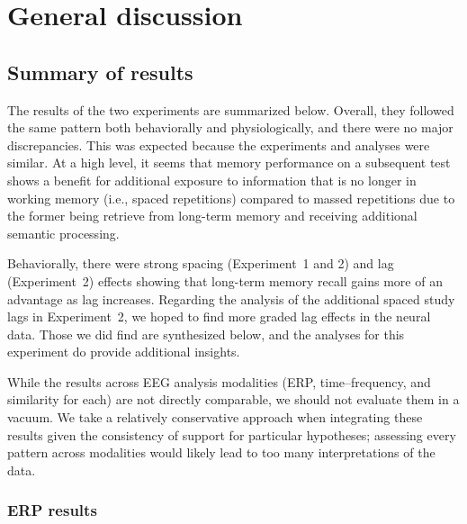 
\chapter{General discussion}


\section{Summary of results}


The results of the two experiments are summarized below.  Overall, they followed the same pattern both behaviorally and physiologically, and there were no major discrepancies.  This was expected because the experiments and analyses were similar.  At a high level, it seems that memory performance on a subsequent test shows a benefit for additional exposure to information that is no longer in working memory (i.e., spaced repetitions) compared to massed repetitions due to the former being retrieve from long-term memory and receiving additional semantic processing.

Behaviorally, there were strong spacing (Experiment~1 and 2) and lag (Experiment~2) effects showing that long-term memory recall gains more of an advantage as lag increases.
Regarding the analysis of the additional spaced study lags in Experiment~2, we hoped to find more graded lag effects in the neural data.  Those we did find are synthesized below, and the analyses for this experiment do provide additional insights.

While the results across EEG analysis modalities (ERP, time--frequency, and similarity for each) are not directly comparable, we should not evaluate them in a vacuum.  We take a relatively conservative approach when integrating these results given the consistency of support for particular hypotheses; assessing every pattern across modalities would likely lead to too many interpretations of the data.


\subsection{ERP results}

